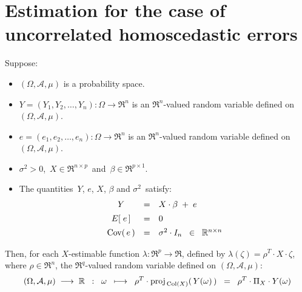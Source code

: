 

\section{Estimation for the case of uncorrelated homoscedastic errors}
\setcounter{theorem}{0}
\setcounter{equation}{0}

\renewcommand{\theenumi}{\roman{enumi}}
\renewcommand{\labelenumi}{\textnormal{(\theenumi)}$\;\;$}


\begin{theorem}
\mbox{}
\vskip 0.1cm
\noindent
Suppose:
\begin{itemize}
\item
	$(\Omega,\mathcal{A},\mu)$ is a probability space.
\item
	$Y = (Y_{1}, Y_{2}, \ldots, Y_{n}) : \Omega \longrightarrow \Re^{n}$ is an $\Re^{n}$-valued random variable
	defined on $(\Omega,\mathcal{A},\mu)$.
\item
	$e = (e_{1}, e_{2}, \ldots, e_{n}) : \Omega \longrightarrow \Re^{n}$ is an $\Re^{n}$-valued random variable
	defined on $(\Omega,\mathcal{A},\mu)$.
\item
	$\sigma^{2} > 0$,\, $X \in \Re^{n \times p}$\, and \,$\beta \in \Re^{p \times 1}$.
\item
	The quantities \,$Y$, $e$, $X$, $\beta$ and $\sigma^{2}$\, satisfy:
	\begin{equation*}
	\begin{array}{ccl}
	Y & = & X \cdot \beta \; + \; e
	\\
	E\!\left[\;e\,\right] &  \overset{{\color{white}\vert}}{=} & 0
	\\
	\Cov\!\left(\,e\,\right) & \overset{{\color{white}\vert}}{=} & \sigma^{2} \cdot I_{n} \;\; \in \;\; \Re^{n \times n}
	\end{array}
	\end{equation*}
\end{itemize}
Then,
for each $X$-estimable function $\lambda : \Re^{p} \longrightarrow \Re$,
defined by $\lambda(\zeta) = \rho^{T} \cdot X \cdot \zeta$, where $\rho \in \Re^{n}$,
the $\Re^{q}$-valued random variable defined on $(\Omega,\mathcal{A},\mu)$:
\begin{equation*}
(\Omega,\mathcal{A},\mu) \;\longrightarrow\; \Re
\;\; : \;\;
\omega
\;\;\longmapsto\;\;
\rho^{T} \cdot \proj_{\,\Col(X)}\!\left(\,Y(\omega)\,\right)
\;\;=\;\;
\rho^{T} \cdot \Pi_{X} \cdot Y(\omega)

\end{equation*}
\end{theorem}
